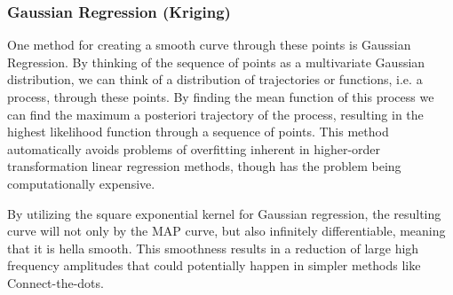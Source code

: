 \subsubsection{Gaussian Regression (Kriging)}
One method for creating a smooth curve through these points is Gaussian Regression.  By thinking of the sequence of points as a multivariate Gaussian distribution, we can think of a distribution of trajectories or functions, i.e. a process, through these points.  By finding the mean function of this process we can find the maximum a posteriori trajectory of the process, resulting in the highest likelihood function through a sequence of points.  This method automatically avoids problems of overfitting inherent in higher-order transformation linear regression methods, though has the problem being computationally expensive.

By utilizing the square exponential kernel for Gaussian regression, the resulting curve will not only by the MAP curve, but also infinitely differentiable, meaning that it is hella smooth.  This smoothness results in a reduction of large high frequency amplitudes that could potentially happen in simpler methods like Connect-the-dots.

